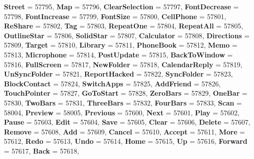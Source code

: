 \begin{DoxyCompactItemize}
\newline
{\bfseries Street} = 57795, 
{\bfseries Map} = 57796, 
{\bfseries Clear\+Selection} = 57797, 
{\bfseries Font\+Decrease} = 57798, 
\newline
{\bfseries Font\+Increase} = 57799, 
{\bfseries Font\+Size} = 57800, 
{\bfseries Cell\+Phone} = 57801, 
{\bfseries Re\+Share} = 57802, 
\newline
{\bfseries Tag} = 57803, 
{\bfseries Repeat\+One} = 57804, 
{\bfseries Repeat\+All} = 57805, 
{\bfseries Outline\+Star} = 57806, 
\newline
{\bfseries Solid\+Star} = 57807, 
{\bfseries Calculator} = 57808, 
{\bfseries Directions} = 57809, 
{\bfseries Target} = 57810, 
\newline
{\bfseries Library} = 57811, 
{\bfseries Phone\+Book} = 57812, 
{\bfseries Memo} = 57813, 
{\bfseries Microphone} = 57814, 
\newline
{\bfseries Post\+Update} = 57815, 
{\bfseries Back\+To\+Window} = 57816, 
{\bfseries Full\+Screen} = 57817, 
{\bfseries New\+Folder} = 57818, 
\newline
{\bfseries Calendar\+Reply} = 57819, 
{\bfseries Un\+Sync\+Folder} = 57821, 
{\bfseries Report\+Hacked} = 57822, 
{\bfseries Sync\+Folder} = 57823, 
\newline
{\bfseries Block\+Contact} = 57824, 
{\bfseries Switch\+Apps} = 57825, 
{\bfseries Add\+Friend} = 57826, 
{\bfseries Touch\+Pointer} = 57827, 
\newline
{\bfseries Go\+To\+Start} = 57828, 
{\bfseries Zero\+Bars} = 57829, 
{\bfseries One\+Bar} = 57830, 
{\bfseries Two\+Bars} = 57831, 
\newline
{\bfseries Three\+Bars} = 57832, 
{\bfseries Four\+Bars} = 57833, 
{\bfseries Scan} = 58004, 
{\bfseries Preview} = 58005, 
\newline
{\bfseries Previous} = 57600, 
{\bfseries Next} = 57601, 
{\bfseries Play} = 57602, 
{\bfseries Pause} = 57603, 
\newline
{\bfseries Edit} = 57604, 
{\bfseries Save} = 57605, 
{\bfseries Clear} = 57606, 
{\bfseries Delete} = 57607, 
\newline
{\bfseries Remove} = 57608, 
{\bfseries Add} = 57609, 
{\bfseries Cancel} = 57610, 
{\bfseries Accept} = 57611, 
\newline
{\bfseries More} = 57612, 
{\bfseries Redo} = 57613, 
{\bfseries Undo} = 57614, 
{\bfseries Home} = 57615, 
\newline
{\bfseries Up} = 57616, 
{\bfseries Forward} = 57617, 
{\bfseries Back} = 57618, 

\end{DoxyCompactItemize}
